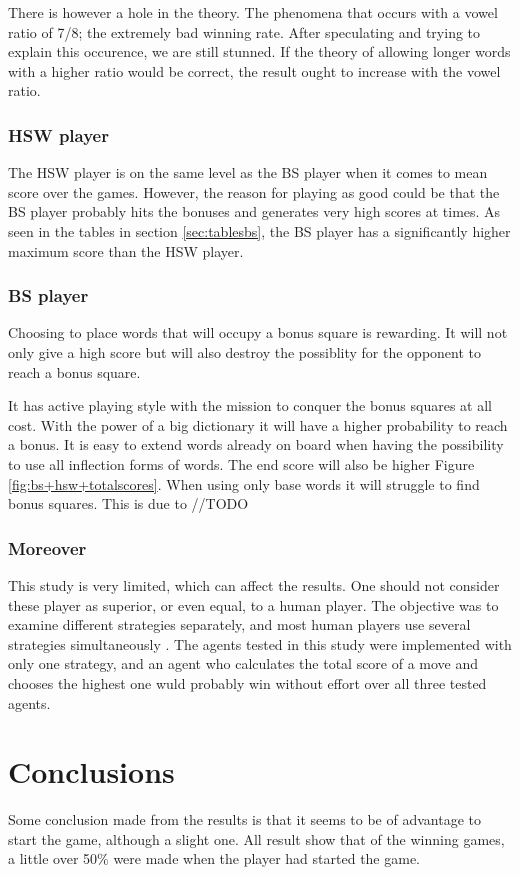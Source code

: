 \documentclass[a4paper, 12pt]{report}
\begin{document}
There is however a hole in the theory. The phenomena that occurs with a vowel ratio of 7/8; the extremely bad winning rate. After speculating and trying to explain this occurence, we are still stunned. If the theory of allowing longer words with a higher ratio would be correct, the result ought to increase with the vowel ratio.

\subsubsection{HSW player}
The HSW player is on the same level as the BS player when it comes to mean score over the games. However, the reason for playing as good could be that the BS player probably hits the bonuses and generates very high scores at times. As seen in the tables in section \ref{sec:tablesbs}, the BS player has a significantly higher maximum score than the HSW player.

\subsubsection{BS player}
Choosing to place words that will occupy a bonus square is rewarding. It will not only give a high score but will also destroy the possiblity for the opponent to reach a bonus square.

It has active playing style with the mission to conquer the bonus squares at all cost. With the power of a big dictionary it will have a higher probability to reach a bonus. It is easy to extend words already on board when having the possibility to use all inflection forms of words. The end score will also be higher Figure \ref{fig:bs+hsw+totalscores}. When using only base words it will struggle to find bonus squares. This is due to //TODO

\subsubsection{Moreover}
This study is very limited, which can affect the results. One should not consider these player as superior, or even equal, to a human player. The objective was to examine different strategies separately, and most human players use several strategies simultaneously \cite{perfectgame}. The agents tested in this study were implemented with only one strategy, and an agent who calculates the total score of a move and chooses the highest one wuld probably win without effort over all three tested agents. 

\section{Conclusions}
Some conclusion made from the results is that it seems to be of advantage to start the game, although a slight one. All result show that of the winning games, a little over 50\% were made when the player had started the game.
\end{document}
